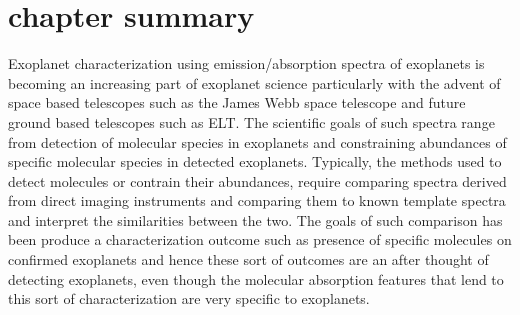 \chapter*{chapter summary}
Exoplanet characterization using emission/absorption spectra of exoplanets is becoming an increasing part of exoplanet science particularly\@ 
with the advent of space based telescopes such as the James Webb space telescope and future ground based telescopes such as ELT.\@
The scientific goals of such spectra range from detection of molecular species in  exoplanets and constraining abundances of specific\@
molecular species in detected exoplanets.
Typically, the methods used to detect molecules or contrain their abundances, require comparing spectra derived from direct imaging instruments and \@ 
comparing them to known template spectra and interpret the similarities between the two.
The goals of such comparison has been produce a characterization outcome such as presence of specific molecules on confirmed exoplanets and hence\@
these sort of outcomes are an after thought of detecting exoplanets, even though the molecular absorption features that lend to this sort of characterization \@
are very specific to exoplanets.

